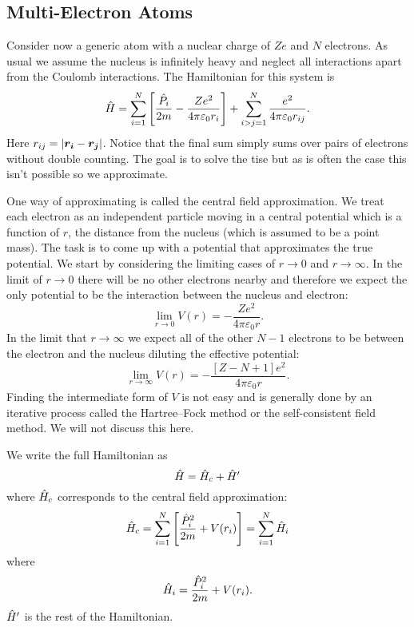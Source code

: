     \subsection{Multi-Electron Atoms}
    Consider now a generic atom with a nuclear charge of \(Ze\) and \(N\) electrons.
    As usual we assume the nucleus is infinitely heavy and neglect all interactions apart from the Coulomb interactions.
    The Hamiltonian for this system is
    \[\hat{H} = \sum_{i=1}^{N}\left[\frac{\hat{P}_i}{2m} - \frac{Ze^2}{4\pi\varepsilon_0r_i}\right] + \sum_{i > j = 1}^{N} \frac{e^2}{4\pi\varepsilon_0 r_{ij}}.\]
    Here \(r_{ij} = \abs{\bm{r_i} - \bm{r_j}}\).
    Notice that the final sum simply sums over pairs of electrons without double counting.
    The goal is to solve the \gls{tise} but as is often the case this isn't possible so we approximate.
    
    One way of approximating is called the central field approximation.
    We treat each electron as an independent particle moving in a central potential which is a function of \(r\), the distance from the nucleus (which is assumed to be a point mass).
    The task is to come up with a potential that approximates the true potential.
    We start by considering the limiting cases of \(r \to 0\) and \(r \to \infty\).
    In the limit of \(r \to 0\) there will be no other electrons nearby and therefore we expect the only potential to be the interaction between the nucleus and electron:
    \[\lim_{r\to 0} V(r) = -\frac{Ze^2}{4\pi\varepsilon_0r}.\]
    In the limit that \(r\to\infty\) we expect all of the other \(N - 1\) electrons to be between the electron and the nucleus diluting the effective potential:
    \[\lim_{r\to\infty} V(r) = -\frac{[Z - N + 1]e^2}{4\pi\varepsilon_0 r}.\]
    Finding the intermediate form of \(V\) is not easy and is generally done by an iterative process called the Hartree--Fock method or the self-consistent field method.
    We will not discuss this here.
    
    We write the full Hamiltonian as
    \[\hat{H} = \hat{H}_c + \hat{H}'\]
    where \(\hat{H}_c\) corresponds to the central field approximation:
    \[\hat{H}_c = \sum_{i=1}^{N} \left[\frac{\hat{P}_i^2}{2m} + V(r_i)\right] = \sum_{i=1}^{N} \hat{H}_i\]
    where
    \[\hat{H}_i = \frac{\hat{P}_i^2}{2m} + V(r_i).\]
    \(\hat{H}'\) is the rest of the Hamiltonian.
    
